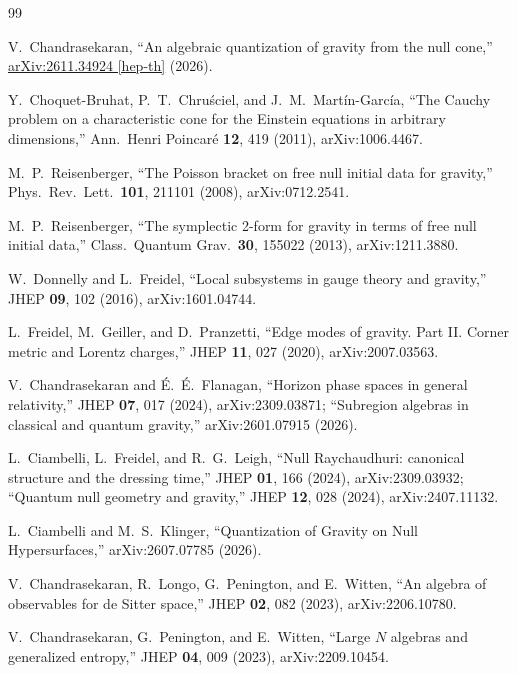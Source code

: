 \documentclass[onecolumn,11pt,aps,prd,amsmath,amssymb,nofootinbib,floatfix]{revtex4-2}
\begin{document}
\begin{thebibliography}{99}

V.~Chandrasekaran, ``An algebraic quantization of gravity from the null cone,'' \href{https://arxiv.org/abs/2611.34924}{arXiv:2611.34924 [hep-th]} (2026).

Y.~Choquet-Bruhat, P.~T.~Chru\'sciel, and J.~M.~Mart\'in-Garc\'ia, ``The Cauchy problem on a characteristic cone for the Einstein equations in arbitrary dimensions,'' Ann.\ Henri Poincar\'e \textbf{12}, 419 (2011), arXiv:1006.4467.

M.~P.~Reisenberger, ``The Poisson bracket on free null initial data for gravity,'' Phys.\ Rev.\ Lett.\ \textbf{101}, 211101 (2008), arXiv:0712.2541.

M.~P.~Reisenberger, ``The symplectic 2-form for gravity in terms of free null initial data,'' Class.\ Quantum Grav.\ \textbf{30}, 155022 (2013), arXiv:1211.3880.

W.~Donnelly and L.~Freidel, ``Local subsystems in gauge theory and gravity,'' JHEP \textbf{09}, 102 (2016), arXiv:1601.04744.

L.~Freidel, M.~Geiller, and D.~Pranzetti, ``Edge modes of gravity. Part II. Corner metric and Lorentz charges,'' JHEP \textbf{11}, 027 (2020), arXiv:2007.03563.

V.~Chandrasekaran and \'E.~\'E.~Flanagan, ``Horizon phase spaces in general relativity,'' JHEP \textbf{07}, 017 (2024), arXiv:2309.03871; ``Subregion algebras in classical and quantum gravity,'' arXiv:2601.07915 (2026).

L.~Ciambelli, L.~Freidel, and R.~G.~Leigh, ``Null Raychaudhuri: canonical structure and the dressing time,'' JHEP \textbf{01}, 166 (2024), arXiv:2309.03932; ``Quantum null geometry and gravity,'' JHEP \textbf{12}, 028 (2024), arXiv:2407.11132.

L.~Ciambelli and M.~S.~Klinger, ``Quantization of Gravity on Null Hypersurfaces,'' arXiv:2607.07785 (2026).

V.~Chandrasekaran, R.~Longo, G.~Penington, and E.~Witten, ``An algebra of observables for de Sitter space,'' JHEP \textbf{02}, 082 (2023), arXiv:2206.10780.

V.~Chandrasekaran, G.~Penington, and E.~Witten, ``Large $N$ algebras and generalized entropy,'' JHEP \textbf{04}, 009 (2023), arXiv:2209.10454.


\end{thebibliography}
\end{document}
